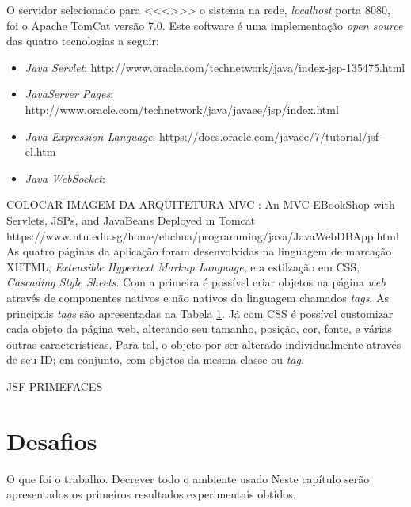 \indent O servidor selecionado para <<<>>> o sistema na rede, \textit{localhost} porta 8080, foi o Apache TomCat versão 7.0. Este software é uma implementação \textit{open source} das quatro tecnologias a seguir:
\begin{itemize}
	\item \textit{Java Servlet}: http://www.oracle.com/technetwork/java/index-jsp-135475.html
	\item \textit{JavaServer Pages}: http://www.oracle.com/technetwork/java/javaee/jsp/index.html
	\item \textit{Java Expression Language}: https://docs.oracle.com/javaee/7/tutorial/jsf-el.htm
	\item \textit{Java WebSocket}:
\end{itemize}

\indent COLOCAR IMAGEM DA ARQUITETURA MVC : An MVC EBookShop with Servlets, JSPs, and JavaBeans Deployed in Tomcat  https://www.ntu.edu.sg/home/ehchua/programming/java/JavaWebDBApp.html \\

\indent As quatro páginas da aplicação foram desenvolvidas na linguagem de marcação XHTML, \textit{Extensible Hypertext Markup Language}, e a estilzação em CSS, \textit{Cascading Style Sheets}. Com a primeira é possível criar objetos na página \textit{web} através de componentes nativos e não nativos da linguagem chamados \textit{tags}. As principais \textit{tags} são apresentadas na Tabela \ref{}. Já com CSS é possível customizar cada objeto da página web, alterando seu tamanho, posição, cor, fonte, e várias outras características. Para tal, o objeto por ser alterado individualmente através de seu ID; em conjunto, com objetos da mesma classe ou \textit{tag}. \\

\indent 

JSF
PRIMEFACES





\section{Desafios}
 

O que foi o trabalho. 
Decrever todo o ambiente usado
Neste capítulo serão apresentados os primeiros resultados experimentais obtidos.
